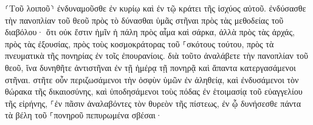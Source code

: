\documentclass{openreader}
\begin{document}
⸂Τοῦ λοιποῦ⸃ ἐνδυναμοῦσθε ἐν κυρίῳ καὶ ἐν τῷ κράτει τῆς ἰσχύος αὐτοῦ. 
ἐνδύσασθε τὴν πανοπλίαν τοῦ θεοῦ πρὸς τὸ δύνασθαι ὑμᾶς στῆναι πρὸς τὰς μεθοδείας τοῦ διαβόλου· 
ὅτι οὐκ ἔστιν ἡμῖν ἡ πάλη πρὸς αἷμα καὶ σάρκα, ἀλλὰ πρὸς τὰς ἀρχάς, πρὸς τὰς ἐξουσίας, πρὸς τοὺς κοσμοκράτορας τοῦ ⸀σκότους τούτου, πρὸς τὰ πνευματικὰ τῆς πονηρίας ἐν τοῖς ἐπουρανίοις. 
διὰ τοῦτο ἀναλάβετε τὴν πανοπλίαν τοῦ θεοῦ, ἵνα δυνηθῆτε ἀντιστῆναι ἐν τῇ ἡμέρᾳ τῇ πονηρᾷ καὶ ἅπαντα κατεργασάμενοι στῆναι. 
στῆτε οὖν περιζωσάμενοι τὴν ὀσφὺν ὑμῶν ἐν ἀληθείᾳ, καὶ ἐνδυσάμενοι τὸν θώρακα τῆς δικαιοσύνης, 
καὶ ὑποδησάμενοι τοὺς πόδας ἐν ἑτοιμασίᾳ τοῦ εὐαγγελίου τῆς εἰρήνης, 
⸀ἐν πᾶσιν ἀναλαβόντες τὸν θυρεὸν τῆς πίστεως, ἐν ᾧ δυνήσεσθε πάντα τὰ βέλη τοῦ ⸀πονηροῦ πεπυρωμένα σβέσαι· 
\end{document}
